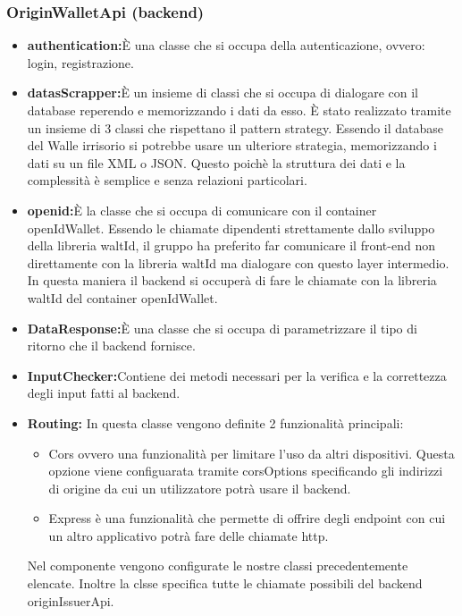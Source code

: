 \subsubsection{OriginWalletApi (backend)}
\begin{itemize}
    \item \textbf{authentication:}È una classe che si occupa della autenticazione, ovvero: login, registrazione. 
    \item \textbf{datasScrapper:}È un insieme di classi che si occupa di dialogare con il database reperendo e memorizzando i dati da esso. È stato realizzato tramite un insieme di 3 classi che rispettano il pattern strategy. Essendo il database del Walle irrisorio si potrebbe usare un ulteriore strategia, memorizzando i dati su un file XML o JSON. Questo poichè la struttura dei dati e la complessità è semplice e senza relazioni particolari.
    \item \textbf{openid:}È la classe che si occupa di comunicare con il container openIdWallet. Essendo le chiamate dipendenti strettamente dallo sviluppo della libreria waltId, il gruppo ha preferito far comunicare il front-end non direttamente con la libreria waltId ma dialogare con questo layer intermedio. In questa maniera il backend si occuperà di fare le chiamate con la libreria waltId del container openIdWallet.
    \item \textbf{DataResponse:}È una classe che si occupa di parametrizzare il tipo di ritorno che il backend fornisce.
    \item \textbf{InputChecker:}Contiene dei metodi necessari per la verifica e la correttezza degli input fatti al backend.
    \item \textbf{Routing:} In questa classe vengono definite 2 funzionalità principali:
    \begin{itemize}
    \item Cors ovvero una funzionalità per limitare l'uso da altri dispositivi. Questa opzione viene configuarata tramite corsOptions specificando gli indirizzi di origine da cui un utilizzatore potrà usare il backend. 
    \item Express è una funzionalità che permette di offrire degli endpoint con cui un altro applicativo potrà fare delle chiamate http. 
    \end{itemize}
    Nel componente vengono configurate le nostre classi precedentemente elencate.
    Inoltre la clsse specifica tutte le chiamate possibili del backend originIssuerApi.
\end{itemize}

